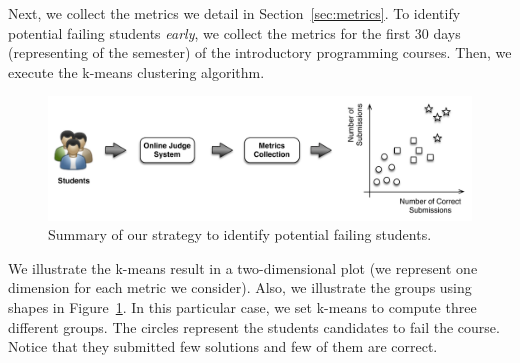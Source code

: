 
Next, we collect the metrics we detail in Section~\ref{sec:metrics}. To identify potential failing students \textit{early}, we collect the metrics for the first 30 days (representing \semesterPercentage of the semester) of the introductory programming courses. Then, we execute the k-means clustering algorithm.

\begin{figure}[h]
\centering
\includegraphics[width=1.0\textwidth,natwidth=610,natheight=642]{images/Strategy.pdf}
\caption{Summary of our strategy to identify potential failing students.}
\label{fig:strategy}
\end{figure}

We illustrate the k-means result in a two-dimensional plot (we represent one dimension for each metric we consider). Also, we illustrate the groups using shapes in Figure~\ref{fig:strategy}. In this particular case, we set k-means to compute three different groups. The circles represent the students candidates to fail the course. Notice that they submitted few solutions and few of them are correct.





